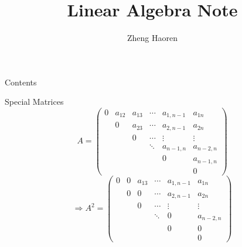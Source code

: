 \documentclass{beamer}
\title{Linear Algebra Note}
\author{Zheng Haoren}
\begin{document}
\begin{frame}
    \titlepage
\end{frame}

\begin{frame}{Contents}
    \tableofcontents
\end{frame}

\begin{frame}{Special Matrices}
    $$A = \begin{pmatrix}
        0   & a_{12}& a_{13}& \cdots& a_{1,n-1} & a_{1n} \\
            & 0     & a_{23}& \cdots& a_{2,n-1} & a_{2n} \\
            &       & 0     & \cdots& \vdots    & \vdots \\
            &       &       & \ddots& a_{n-1,n} & a_{n-2,n}\\
            &       &       &       & 0         & a_{n-1,n}\\
            &       &       &       &           & 0
    \end{pmatrix}$$
    $$\Rightarrow A^2 = \begin{pmatrix}
        0   & 0     & a_{13}& \cdots& a_{1,n-1} & a_{1n} \\
            & 0     & 0     & \cdots& a_{2,n-1} & a_{2n} \\
            &       & 0     & \cdots& \vdots    & \vdots \\
            &       &       & \ddots& 0         & a_{n-2,n}\\
            &       &       &       & 0         & 0\\
            &       &       &       &           & 0
    \end{pmatrix}$$
    
\end{frame}
\end{document}
